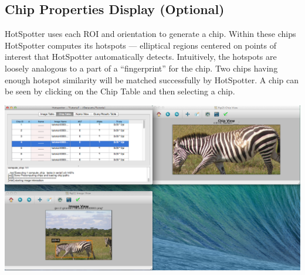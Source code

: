 \documentclass[a4paper,10pt]{article}
\begin{document}
    \subsection{Chip Properties Display (Optional)} 
        HotSpotter uses each ROI and orientation to generate a chip. 
        Within these chips HotSpotter computes its hotspots --- elliptical
        regions centered on points of interest that HotSpotter automatically
        detects.  Intuitively, the hotspots are loosely analogous to a
        part of a ``fingerprint'' for the chip.  Two chips having enough hotspot similarity
        will be matched successfully by HotSpotter. A chip can be seen by clicking 
	on the Chip Table and then selecting a chip.

        \begin{center}
          \includegraphics[scale=0.2]{images/chip.png}
        \end{center}
\end{document}
